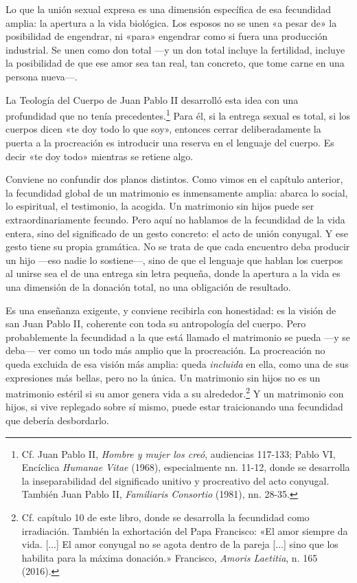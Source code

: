 Lo que la unión sexual expresa es una dimensión específica de esa fecundidad amplia: la apertura a la vida biológica. Los esposos no se unen «a pesar de» la posibilidad de engendrar, ni «para» engendrar como si fuera una producción industrial. Se unen como don total ---y un don total incluye la fertilidad, incluye la posibilidad de que ese amor sea tan real, tan concreto, que tome carne en una persona nueva---.

La Teología del Cuerpo de Juan Pablo II desarrolló esta idea con una profundidad que no tenía precedentes.\footnote{Cf. Juan Pablo II, \textit{Hombre y mujer los creó}, audiencias 117-133; Pablo VI, Encíclica \textit{Humanae Vitae} (1968), especialmente nn. 11-12, donde se desarrolla la inseparabilidad del significado unitivo y procreativo del acto conyugal. También Juan Pablo II, \textit{Familiaris Consortio} (1981), nn. 28-35.} Para él, si la entrega sexual es total, si los cuerpos dicen «te doy todo lo que soy», entonces cerrar deliberadamente la puerta a la procreación es introducir una reserva en el lenguaje del cuerpo. Es decir «te doy todo» mientras se retiene algo.

Conviene no confundir dos planos distintos. Como vimos en el capítulo anterior, la fecundidad global de un matrimonio es inmensamente amplia: abarca lo social, lo espiritual, el testimonio, la acogida. Un matrimonio sin hijos puede ser extraordinariamente fecundo. Pero aquí no hablamos de la fecundidad de la vida entera, sino del significado de un gesto concreto: el acto de unión conyugal. Y ese gesto tiene su propia gramática. No se trata de que cada encuentro deba producir un hijo ---eso nadie lo sostiene---, sino de que el lenguaje que hablan los cuerpos al unirse sea el de una entrega sin letra pequeña, donde la apertura a la vida es una dimensión de la donación total, no una obligación de resultado.

Es una enseñanza exigente, y conviene recibirla con honestidad: es la visión de san Juan Pablo II, coherente con toda su antropología del cuerpo. Pero probablemente la fecundidad a la que está llamado el matrimonio se pueda ---y se deba--- ver como un todo más amplio que la procreación. La procreación no queda excluida de esa visión más amplia: queda \emph{incluida} en ella, como una de sus expresiones más bellas, pero no la única. Un matrimonio sin hijos no es un matrimonio estéril si su amor genera vida a su alrededor.\footnote{Cf. capítulo 10 de este libro, donde se desarrolla la fecundidad como irradiación. También la exhortación del Papa Francisco: «El amor siempre da vida. [...] El amor conyugal no se agota dentro de la pareja [...] sino que los habilita para la máxima donación.» Francisco, \textit{Amoris Laetitia}, n. 165 (2016).} Y un matrimonio con hijos, si vive replegado sobre sí mismo, puede estar traicionando una fecundidad que debería desbordarlo.

